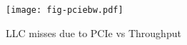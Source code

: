 \begin{figure}[t]
\texttt{[image: fig-pciebw.pdf]}
\caption{LLC misses due to PCIe vs Throughput}
\label{fig:membw}
\end{figure}
